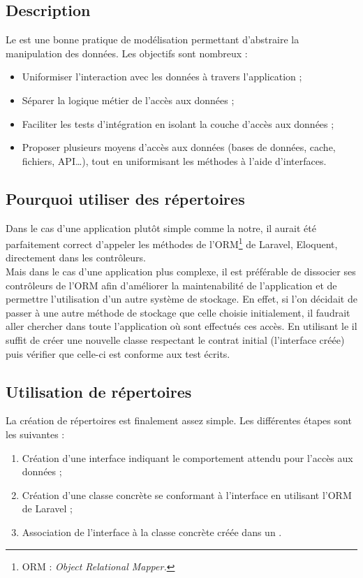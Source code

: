 	\subsection{Description}
		Le \repositoryPattern{} est une bonne pratique de modélisation permettant d'abstraire la manipulation des données. Les objectifs sont nombreux :
		\begin{itemize}
			\item Uniformiser l’interaction avec les données à travers l'application ;
			\item Séparer la logique métier de l'accès aux données ;
			\item Faciliter les tests d'intégration en isolant la couche d'accès aux données ;
			\item Proposer plusieurs moyens d'accès aux données (bases de données, cache, fichiers, API\dots), tout en uniformisant les méthodes à l'aide d'interfaces.
		\end{itemize}

	\subsection{Pourquoi utiliser des répertoires}
		Dans le cas d'une application plutôt simple comme la notre, il aurait été parfaitement correct d'appeler les méthodes de l'ORM\footnote{ORM : \textit{Object Relational Mapper.}} de Laravel, Eloquent, directement dans les contrôleurs.\\

		Mais dans le cas d'une application plus complexe, il est préférable de dissocier ses contrôleurs de l'ORM afin d'améliorer la maintenabilité de l'application et de permettre l'utilisation d'un autre système de stockage. En effet, si l'on décidait de passer à une autre méthode de stockage que celle choisie initialement, il faudrait aller chercher dans toute l'application où sont effectués ces accès. En utilisant le \repositoryPattern{} il suffit de créer une nouvelle classe respectant le contrat initial (l'interface créée) puis vérifier que celle-ci est conforme aux test écrits.

	\subsection{Utilisation de répertoires}
		La création de répertoires est finalement assez simple. Les différentes étapes sont les suivantes :
		\begin{enumerate}
			\item Création d'une interface indiquant le comportement attendu pour l'accès aux données ;
			\item Création d'une classe concrète se conformant à l'interface en utilisant l'ORM de Laravel ;
			\item Association de l'interface à la classe concrète créée dans un \serviceProvider.
		\end{enumerate}

